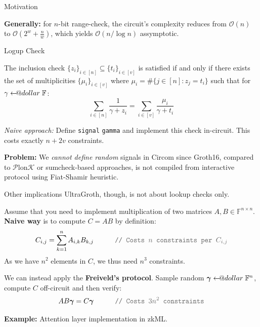 \documentclass{zkdl-presentation-template}
\makeatletter
\newcommand\leftarrowS{\leftarrow\joinrel\smalldollar}
\newcommand{\smalldollar}{\mathrel{\mathpalette\small@dollar\relax}}
\newcommand{\small@dollar}[2]{%
  \vcenter{\hbox{%
    $#1\textnormal{\fontsize{0.7\dimexpr\f@size pt}{0}\selectfont\$}$%
  }}%
}
\makeatother
\begin{document}
\begin{frame}{Motivation}
\begin{tikzpicture}
        \end{tikzpicture}

        \pause\textbf{Generally:} for $n$-bit range-check, the circuit's complexity
        reduces from $\mathcal{O}(n)$ to $\mathcal{O}(2^w + \frac{n}{w})$, which
        yields $\mathcal{O}(n/\log n)$ assymptotic.
    \end{frame}

    \begin{frame}{Logup Check}
        \begin{theorem}
            The inclusion check $\{z_i\}_{i \in [n]} \subseteq \{t_i\}_{i \in
            [v]}$ is satisfied if and only if there exists the set of
            multiplicities $\{\mu_i\}_{i \in [v]}$ where $\mu_i = \#\{j \in [n]:
            z_j = t_i\}$ such that for $\gamma \leftarrowS \mathbb{F}$:
            \begin{equation*}
                \sum_{i \in [n]} \frac{1}{\gamma + z_i} = \sum_{i \in [v]} \frac{\mu_i}{\gamma + t_i}
            \end{equation*}
        \end{theorem}

        \pause\textit{Naive approach:} Define \texttt{\textcolor{blue!70!black}{signal}} \texttt{gamma} and implement this check
        in-circuit. This costs exactly $n + 2v$ constraints.\pause

        \textcolor{red!70!black}{\textbf{Problem:}} We \textit{cannot define
        random} signals in Circom since Groth16, compared to
        $\mathcal{P}$lon$\mathcal{K}$ or sumcheck-based approaches, is not
        compiled from interactive protocol using Fiat-Shamir heuristic.
    \end{frame}

    \begin{frame}{Other implications}
        UltraGroth, though, is not about lookup checks only.\pause

        Assume that you need to implement multiplication of two matrices $A,B
        \in \mathbb{F}^{n \times n}$. \textbf{Naive way} is to compute $C=AB$ by definition:\pause
        \begin{equation*}
            C_{i,j} = \sum_{k=1}^n A_{i,k}B_{k,j} \hspace{30px} \textcolor{gray!80!black}{\texttt{// Costs $n$ constraints per $C_{i,j}$}}
        \end{equation*}
        As we have $n^2$ elements in $C$, we thus need $n^3$ constraints.\pause

        We can instead apply the \textbf{Freiveld's protocol}. Sample random 
        $\boldsymbol{\gamma} \leftarrowS \mathbb{F}^n$, compute $C$ off-circuit 
        and then verify:
        \begin{equation*}
            AB\boldsymbol{\gamma} = C\boldsymbol{\gamma} \hspace{30px} \textcolor{gray!80!black}{\texttt{// Costs $3n^2$ constraints}}
        \end{equation*} 

        \textbf{Example:} Attention layer implementation in zkML.
    \end{frame}
\end{document}
